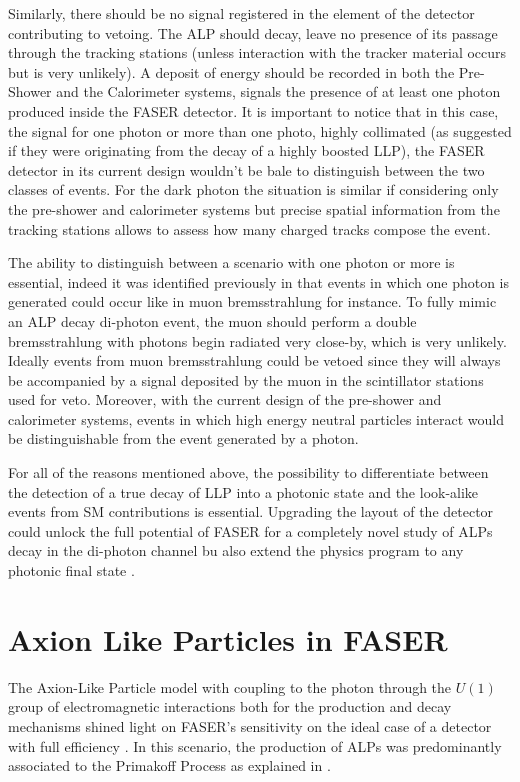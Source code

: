 		Similarly, there should be no signal registered in the element of the detector contributing to vetoing. The ALP should decay, leave no presence of its passage through the tracking stations (unless interaction with the tracker material occurs but is very unlikely). A deposit of energy should be recorded in both the Pre-Shower and the Calorimeter systems, signals the presence of at least one photon produced inside the FASER detector. It is important to notice that in this case, the signal for one photon or more than one photo, highly collimated (as suggested if they were originating from the decay of a highly boosted LLP), the FASER detector in its current design wouldn't be bale to distinguish between the two classes of events. For the dark photon the situation is similar if considering only the pre-shower and calorimeter systems but precise spatial information from the tracking stations allows to assess how many charged tracks compose the event. 
	
		The ability to distinguish between a scenario with one photon or more is essential, indeed it was identified previously in  that events in which one photon is generated could occur like in muon bremsstrahlung for instance. To fully mimic an ALP decay di-photon event, the muon should perform a double bremsstrahlung with photons begin radiated very close-by, which is very unlikely. Ideally events from muon bremsstrahlung could be vetoed since they will always be accompanied by a signal deposited by the muon in the scintillator stations used for veto. Moreover, with the current design of the pre-shower and calorimeter systems, events in which high energy neutral particles interact would be distinguishable from the event generated by a photon. 
		
		For all of the reasons mentioned above, the possibility to differentiate between the detection of a true decay of LLP into a photonic state and the look-alike events from SM contributions is essential. Upgrading the layout of the detector could unlock the full potential of FASER for a completely novel study of ALPs decay in the di-photon channel bu also extend the physics program to any photonic final state \cite{PreShower_TP}. 
	
	
		
	\clearpage
	\section{Axion Like Particles in FASER}
		The Axion-Like Particle model with coupling to the photon through the $U(1)$ group of electromagnetic interactions both for the production and decay mechanisms shined light on FASER's sensitivity on the ideal case of a detector with full efficiency . In this scenario, the production of ALPs was predominantly associated to the Primakoff Process as explained in .
		
